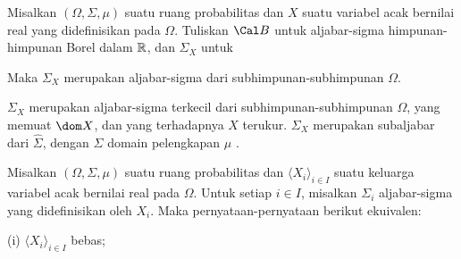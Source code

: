  Misalkan $(\Omega,\Sigma,\mu)$ suatu ruang
probabilitas dan $X$ suatu variabel acak bernilai real yang didefinisikan
pada $\Omega$. Tuliskan $\Cal B$ untuk aljabar-sigma himpunan-himpunan
Borel dalam $\Bbb R$, dan $\Sigma_X$ untuk


\noindent Maka $\Sigma_X$ merupakan aljabar-sigma dari subhimpunan-subhimpunan
$\Omega$.

$\Sigma_X$ merupakan aljabar-sigma terkecil dari
subhimpunan-subhimpunan $\Omega$, yang memuat $\dom X$, dan yang terhadapnya
$X$ terukur. $\Sigma_X$ merupakan subaljabar dari
$\hat\Sigma$, dengan $\hat\Sigma$ domain pelengkapan $\mu$
.


 Misalkan $(\Omega,\Sigma,\mu)$ suatu ruang
probabilitas dan $\langle X_i\rangle_{i\in I}$ suatu keluarga variabel acak
bernilai real pada $\Omega$. Untuk setiap $i\in I$, misalkan $\Sigma_i$
aljabar-sigma yang didefinisikan oleh $X_i$.
Maka pernyataan-pernyataan berikut ekuivalen:

(i) $\langle X_i\rangle_{i\in I}$ bebas;

